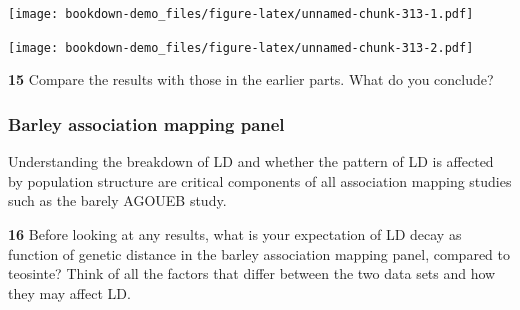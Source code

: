 \documentclass[
]{book}
\makeatletter
\newenvironment{Shaded}{\begin{snugshade}}{\end{snugshade}}
\newcommand{\AttributeTok}[1]{\textcolor[rgb]{0.77,0.63,0.00}{#1}}
\newcommand{\DecValTok}[1]{\textcolor[rgb]{0.00,0.00,0.81}{#1}}
\newcommand{\FloatTok}[1]{\textcolor[rgb]{0.00,0.00,0.81}{#1}}
\newcommand{\FunctionTok}[1]{\textcolor[rgb]{0.00,0.00,0.00}{#1}}
\newcommand{\NormalTok}[1]{#1}
\newcommand{\OtherTok}[1]{\textcolor[rgb]{0.56,0.35,0.01}{#1}}
\newcommand{\SpecialCharTok}[1]{\textcolor[rgb]{0.00,0.00,0.00}{#1}}
\newcommand{\StringTok}[1]{\textcolor[rgb]{0.31,0.60,0.02}{#1}}
\newenvironment{kframe}{%
\medskip{}
\setlength{\fboxsep}{.8em}
 \def\at@end@of@kframe{}%
 \ifinner\ifhmode%
  \def\at@end@of@kframe{\end{minipage}}%
  \begin{minipage}{\columnwidth}%
 \fi\fi%
 \def\FrameCommand##1{\hskip\@totalleftmargin \hskip-\fboxsep
 \colorbox{shadecolor}{##1}\hskip-\fboxsep
     \hskip-\linewidth \hskip-\@totalleftmargin \hskip\columnwidth}%
 \MakeFramed {\advance\hsize-\width
   \@totalleftmargin\z@ \linewidth\hsize
   \@setminipage}}%
 {\par\unskip\endMakeFramed%
 \at@end@of@kframe}
\newenvironment{rmdblock}[1]
  {
  \begin{itemize}
  \renewcommand{\labelitemi}{
    \raisebox{-.7\height}[0pt][0pt]{
      {\setkeys{Gin}{width=3em,keepaspectratio}\texttt{[image: images/\#1]}}
    }
  }
  \setlength{\fboxsep}{1em}
  \begin{kframe}
  \item
  }
  {
  \end{kframe}
  \end{itemize}
  }
\newenvironment{rmdquiz}
  {\begin{rmdblock}{quiz}}
  {\end{rmdblock}}
\makeatother
\begin{document}
\texttt{[image: bookdown-demo\_files/figure-latex/unnamed-chunk-313-1.pdf]}

\begin{Shaded}
\end{Shaded}

\texttt{[image: bookdown-demo\_files/figure-latex/unnamed-chunk-313-2.pdf]}

\begin{rmdquiz}
\textbf{15}
Compare the results with those in the earlier parts. What do you conclude?
\end{rmdquiz}

\hypertarget{barley-association-mapping-panel}{%
\subsubsection{Barley association mapping panel}\label{barley-association-mapping-panel}}

Understanding the breakdown of LD and whether the pattern of LD is affected by population structure are critical components of all association mapping studies such as the barely AGOUEB study.

\begin{rmdquiz}
\textbf{16}
Before looking at any results, what is your expectation of LD decay as function of genetic distance in the barley association mapping panel, compared to teosinte? Think of all the factors that differ between the two data sets and how they may affect LD.
\end{rmdquiz}
\end{document}
